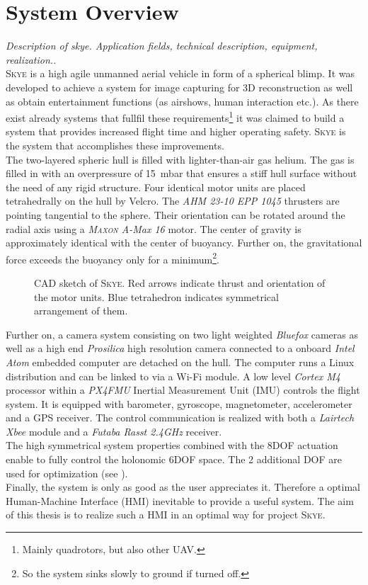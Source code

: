 \section{System Overview}
\label{sec:system overview}
\textit{Description of skye. Application fields, technical description, equipment, realization..} \\
\textsc{Skye} is a high agile unmanned aerial vehicle in form of a spherical blimp. It was developed to achieve a system for image capturing for 3D reconstruction as well as obtain entertainment functions (as airshows, human interaction etc.). As there exist already systems that fullfil these requirements\footnote{Mainly quadrotors, but also other UAV.} it was claimed to build a system that provides increased flight time and higher operating safety. \textsc{Skye} is the system that accomplishes these improvements. \\
The two-layered spheric hull is filled with lighter-than-air gas helium. The gas is filled in with an overpressure of \SI{15}{\milli\bar} that ensures a stiff hull surface without the need of any rigid structure. Four identical motor units are placed tetrahedrally on the hull by Velcro. The \textit{AHM 23-10 EPP 1045} thrusters are pointing tangential to the sphere. Their orientation can be rotated around the radial axis using a \textit{\textsc{Maxon} A-Max 16} motor. The center of gravity is approximately identical with the center of buoyancy. Further on, the gravitational force exceeds the buoyancy only for a minimum\footnote{So the system sinks slowly to ground if turned off.}.
\begin{figure}[H]
    \centering
    \def\svgwidth{0.8\columnwidth}
    
    \caption{CAD sketch of \textsc{Skye}. Red arrows indicate thrust and orientation of the motor units. Blue tetrahedron indicates symmetrical arrangement of them. }
    \label{fig:scene_trajectoryFollowing}
\end{figure}
Further on, a camera system consisting on two light weighted \textit{Bluefox} cameras as well as a high end \textit{Prosilica} high resolution camera connected to a onboard \textit{Intel Atom} embedded computer are detached on the hull. The computer runs a Linux distribution and can be linked to via a Wi-Fi module. A low level \textit{Cortex M4} processor within a \textit{PX4FMU} Inertial Measurement Unit (IMU) controls the flight system. It is equipped with barometer, gyroscope, magnetometer, accelerometer and a GPS receiver. The control communication is realized with both a \textit{Lairtech Xbee} module and a \textit{Futaba Rasst 2.4GHz} receiver. \\
The high symmetrical system properties combined with the 8DOF actuation enable to fully control the holonomic 6DOF space. The 2 additional DOF are used for optimization (see \cite{schaffnervu}).  \\
Finally, the system is only as good as the user appreciates it. Therefore a optimal Human-Machine Interface (HMI) inevitable to provide a useful system. The aim of this thesis is to realize such a HMI in an optimal way for project \textsc{Skye}.
